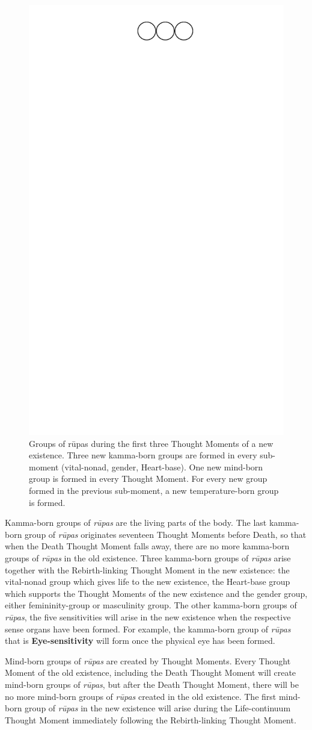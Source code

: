 \begin{figure}[h]
\centering
\includegraphics[width=0.5\linewidth]{./Diagrams/NewRupa}
\caption{Groups of rūpas during the first three Thought Moments of a new existence. Three new kamma-born groups are formed in every sub-moment (vital-nonad, gender, Heart-base). One new mind-born group is formed in every Thought Moment. For every new group formed in the previous sub-moment, a new temperature-born group is formed.}
\label{fig:NewRupa}
\end{figure}

Kamma-born groups of \textit{rūpas} are the living parts of the body. The last kamma-born group of \textit{rūpas} originates seventeen Thought Moments before Death, so that when the Death Thought Moment falls away, there are no more kamma-born groups of \textit{rūpas} in the old existence. Three kamma-born groups of \textit{rūpas} arise together with the Rebirth-linking Thought Moment in the new existence: the vital-nonad group which gives life to the new existence, the Heart-base group which supports the Thought Moments of the new existence and the gender group, either femininity-group or masculinity group. The other kamma-born groups of \textit{rūpas}, the five sensitivities will arise in the new existence when the respective sense organs have been formed. For example, the kamma-born group of \textit{rūpas} that is \textbf{Eye-sensitivity} will form once the physical eye has been formed.

Mind-born groups of \textit{rūpas} are created by Thought Moments. Every Thought Moment of the old existence, including the Death Thought Moment will create mind-born groups of \textit{rūpas}, but after the Death Thought Moment, there will be no more mind-born groups of \textit{rūpas} created in the old existence. The first mind-born group of \textit{rūpas} in the new existence will arise during the Life-continuum Thought Moment immediately following the Rebirth-linking Thought Moment.

